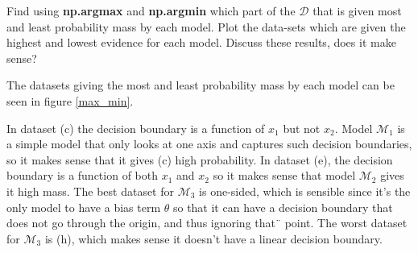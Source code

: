 \documentclass[12pt]{article}
\newenvironment{question}[2][Question]{\begin{trivlist}
\kern10pt
\item[\hskip \labelsep {\bfseries #1}\hskip \labelsep {\bfseries #2.}]}{\end{trivlist}}
\newcommand*{\answer}{%
  \par
  \kern1pt
  \begingroup
    \centering
    \raisebox{.2\baselineskip}{%
      \textcolor{gray}{
	    \rule{.6667\linewidth}{.1pt}%
      }
    }%
    \par
  \kern8pt
  \endgroup
}
\begin{document}
\begin{question}{28}
Find using \textbf{np.argmax} and \textbf{np.argmin} which part of the $\mathcal{D}$ that is given most and least probability mass by each model. Plot the data-sets which are given the highest and lowest evidence for each model. Discuss these results, does it make sense?

\answer

The datasets giving the most and least probability mass by each model can be seen in figure \ref{max_min}.

In dataset (c) the decision boundary is a function of $x_1$ but not $x_2$. Model $\mathcal{M}_1$ is a simple model that only looks at one axis and captures such decision boundaries, so it makes sense that it gives (c) high probability. In dataset (e), the decision boundary is a function of both $x_1$ and $x_2$ so it makes sense that model $\mathcal{M}_2$ gives it high mass.
The best dataset for $\mathcal{M}_3$ is one-sided, which is sensible since it's the only model to have a bias term $\theta$ so that it can have a decision boundary that does not go through the origin, and thus ignoring that¨ point. The worst dataset for $\mathcal{M}_3$ is (h), which makes sense it doesn't have a linear decision boundary.


\end{question}
\end{document}
